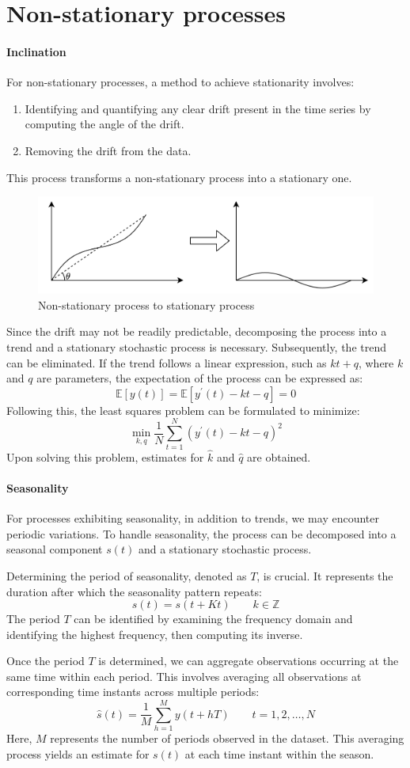 \section{Non-stationary processes}

\paragraph*{Inclination}
For non-stationary processes, a method to achieve stationarity involves:
\begin{enumerate}
    \item Identifying and quantifying any clear drift present in the time series by computing the angle of the drift.
    \item Removing the drift from the data.
\end{enumerate}
This process transforms a non-stationary process into a stationary one.
\begin{figure}[H]
    \centering
    \includegraphics[width=0.75\linewidth]{images/stat.png}
    \caption{Non-stationary process to stationary process}
\end{figure}
Since the drift may not be readily predictable, decomposing the process into a trend and a stationary stochastic process is necessary. 
Subsequently, the trend can be eliminated. 
If the trend follows a linear expression, such as $kt+q$, where $k$ and $q$ are parameters, the expectation of the process can be expressed as:
\[\mathbb{E}\left[y(t)\right]=\mathbb{E}\left[y^\prime(t)-kt-q\right]=0\]
Following this, the least squares problem can be formulated to minimize:
\[\min_{k,q}\dfrac{1}{N}\sum_{t=1}^{N}\left(y^\prime(t)-kt-q\right)^2\]
Upon solving this problem, estimates for $\hat{k}$ and $\hat{q}$ are obtained.

\paragraph*{Seasonality}
For processes exhibiting seasonality, in addition to trends, we may encounter periodic variations. 
To handle seasonality, the process can be decomposed into a seasonal component $s(t)$ and a stationary stochastic process.

Determining the period of seasonality, denoted as $T$, is crucial. 
It represents the duration after which the seasonality pattern repeats:
\[s(t)=s(t+Kt)\qquad k \in \mathbb{Z}\]
The period $T$ can be identified by examining the frequency domain and identifying the highest frequency, then computing its inverse.

Once the period $T$ is determined, we can aggregate observations occurring at the same time within each period. 
This involves averaging all observations at corresponding time instants across multiple periods:
\[\hat{s}(t)=\dfrac{1}{M}\sum_{h=1}^{M}y(t+hT)\qquad t=1,2,\dots,N\]
Here, $M$ represents the number of periods observed in the dataset.
This averaging process yields an estimate for $s(t)$ at each time instant within the season.